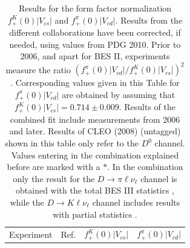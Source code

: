 

\begin{table}[!htb]
\begin{center}
 \caption[]{Results for the form factor normalization
$f_+^K(0)|V_{cs}|$ and $f_+^{\pi}(0)|V_{cd}|$. Results from the
different collaborations have been corrected, if needed, using
values from PDG 2010. Prior to 2006, and apart for BES II, experiments
measure the ratio $(f_+^{\pi}(0)|V_{cd}| / f_+^K(0)|V_{cs}|)^2$. 
Corresponding values given in this Table for $f_+^{\pi}(0)|V_{cd}|$
are obtained by assuming that $f_+^K(0)|V_{cs}|=0.714\pm 0.009$.
Results of the combined fit include measurements from 2006 and later. 
Results of CLEO (2008) (untagged) shown in this table only refer to the $D^0$ channel.
Values entering in the combination explained before are marked with a $\ast$. 
In the combination only the result for the $D \to \pi \ell \nu_\ell $ channel is obtained 
with the total BES III statistics \cite{BESIII-new}, while the $D \to K \ell \nu_\ell $ 
channel includes results with partial statistics \cite{BESIII}.
 \label{norma}}
\begin{tabular}{c c c c}
\vspace*{-10pt} & \\
\hline
Experiment & Ref. & $f_+^K(0)|V_{cs}|$ & $f_+^{\pi}(0)|V_{cd}|$ \\

\end{tabular}
\end{center}
\end{table}
